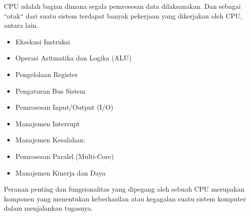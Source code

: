 CPU adalah bagian dimana segala pemrosesan data dilaksanakan.
Dan sebagai ``otak`` dari suatu sistem terdapat banyak pekerjaan yang dikerjakan oleh CPU, antara lain.

\begin{itemize}
  \item Eksekusi Instruksi
  \item Operasi Aritmatika dan Logika (ALU)
  \item Pengelolaan Register
  \item Pengaturan Bus Sistem
  \item Pemrosesan Input/Output (I/O)
  \item Manajemen Interrupt
  \item Manajemen Kesalahan:
  \item Pemrosesan Paralel (Multi-Core)
  \item Manajemen Kinerja dan Daya
\end{itemize}

Peranan penting dan fungsionalitas yang dipegang oleh sebuah CPU merupakan komponen yang menentukan
keberhasilan atau kegagalan suatu sistem komputer dalam menjalankan tugasnya.
